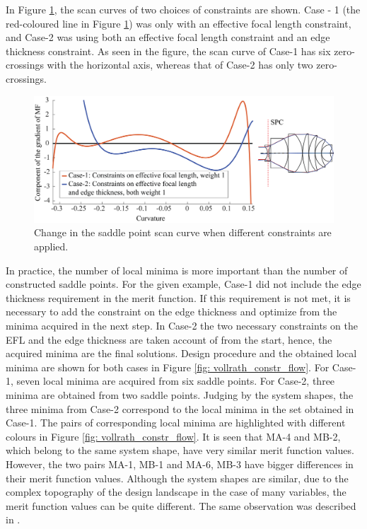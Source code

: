 In Figure \ref{fig: vollrath_consdif}, the scan curves of two choices of constraints are shown. Case - 1 (the red-coloured line in Figure \ref{fig: vollrath_consdif}) was only with an effective focal length constraint, and Case-2 was using both an effective focal length constraint and an edge thickness constraint. As seen in the figure, the scan curve of Case-1 has six zero-crossings with the horizontal axis, whereas that of Case-2 has only two zero-crossings. 
\begin{figure}[h!]
    \centering
    \includegraphics[width=\textwidth]{chapter-4/figures/Vollrath_ConstraintDif.png}
    \caption{Change in the saddle point scan curve when different constraints are applied.}
    \label{fig: vollrath_consdif}
\end{figure}

In practice, the number of local minima is more important than the number of constructed saddle points. For the given example, Case-1 did not include the edge thickness requirement in the merit function. If this requirement is not met, it is necessary to add the constraint on the edge thickness and optimize from the minima acquired in the next step. In Case-2 the two necessary constraints on the EFL and the edge thickness are taken account of from the start, hence, the acquired minima are the final solutions. Design procedure and the obtained local minima are shown for both cases in Figure \ref{fig: vollrath_constr_flow}. For Case-1, seven local minima are acquired from six saddle points. For Case-2, three minima are obtained from two saddle points. Judging by the system shapes, the three minima from Case-2 correspond to the local minima in the set obtained in Case-1. The pairs of corresponding local minima are highlighted with different colours in Figure \ref{fig: vollrath_constr_flow}. It is seen that MA-4 and MB-2, which belong to the same system shape, have very similar merit function values. However, the two pairs MA-1, MB-1 and MA-6, MB-3 have bigger differences in their merit function values. Although the system shapes are similar, due to the complex topography of the design landscape in the case of many variables, the merit function values can be quite different. The same observation was described in \cite{PascalTriplet2009}. 


